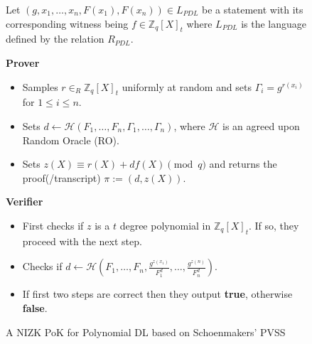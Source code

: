 \begin{figure}[ht]
    \centering
    \begin{tcolorbox}[title=\textbf{A NIZK PoK for Polynomial DL}, width=0.9\textwidth, colframe=blue!75!black, colback=blue!10, sharp corners]
        Let $(g,x_1,\dots,x_n,F(x_1),F(x_n))\in L_{PDL}$ be a statement with its corresponding witness being $f\in\mathbb{Z}_q[X]_t$ 
        where $L_{PDL}$ is the language defined by the relation $R_{PDL}$.
        
        \vspace{0.5em}
        \textbf{Prover}
        \begin{itemize}
            \item Samples $r\in_{R}\mathbb{Z}_q[X]_t$ uniformly at random and sets 
                $\Gamma_i=g^{r(x_i)}$ for $1\leq i\leq n$.
            \item Sets $d\leftarrow \mathcal{H}(F_1, \dots, F_n, \Gamma_1, \dots, \Gamma_n)$, where $\mathcal{H}$ is 
                an agreed upon Random Oracle (RO).
            \item Sets $z(X)\equiv r(X)+df(X) \pmod{q}$ and returns the proof(/transcript) $\pi:= (d,z(X))$.
        \end{itemize}
        
        \vspace{0.5em}
        \textbf{Verifier}
        \begin{itemize}
            \item First checks if $z$ is a $t$ degree polynomial in $\mathbb{Z}_q[X]_t$. If so, they proceed with the next step.
            \item Checks if $d\leftarrow \mathcal{H}(F_1, \dots, F_n,\frac{g^{z(x_1)}}{F_1^d}, \dots, \frac{g^{z(n)}}{F_n^d})$. 
            \item If first two steps are correct then they output \textbf{true}, otherwise \textbf{false}.
        \end{itemize}
    \end{tcolorbox}
    \caption{A NIZK PoK for Polynomial DL based on Schoenmakers' PVSS}
    \label{fig:polynomial-dl}
\end{figure}
